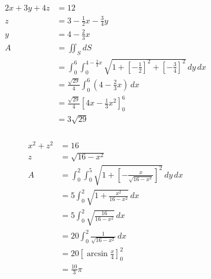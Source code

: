 \documentclass{article}
\begin{document}
\begin{align*}
  2 x + 3 y + 4 z & = 12                                                                                                                     \\
  z               & = 3 - \frac{1}{2} x - \frac{3}{4} y                                                                                      \\
  y               & = 4 - \frac{2}{3} x                                                                                                      \\
  A               & = \iint_S dS                                                                                                             \\
                  & = \int_0^6 \int_0^{4 - \frac{2}{3} x} \sqrt{1 + \left[ -\frac{1}{2} \right]^2 + \left[ -\frac{3}{4} \right]^2} \,dy \,dx \\
                  & = \frac{\sqrt{29}}{4} \int_0^6 \left( 4 - \frac{2}{3} x \right) \,dx                                                     \\
                  & = \frac{\sqrt{29}}{4} \left[ 4 x - \frac{1}{3} x^2 \right]_0^6                                                           \\
                  & = 3 \sqrt{29}
\end{align*}

\setcounter{subsubsection}{2}
\subsubsection{}

\begin{align*}
  x^2 + z^2 & = 16                                                                                 \\
  z         & = \sqrt{16 - x^2}                                                                    \\
  A         & = \int_0^2 \int_0^5 \sqrt{1 + \left[ -\frac{x}{\sqrt{16 - x^2}} \right]^2} \,dy \,dx \\
            & = 5 \int_0^2 \sqrt{1 + \frac{x^2}{16 - x^2}} \,dx                                    \\
            & = 5 \int_0^2 \sqrt{\frac{16}{16 - x^2}} \,dx                                         \\
            & = 20 \int_0^2 \frac{1}{\sqrt{16 - x^2}} \,dx                                         \\
            & = 20 \left[ \arcsin \frac{x}{4} \right]_0^2                                          \\
            & = \frac{10}{3} \pi
\end{align*}
\end{document}
